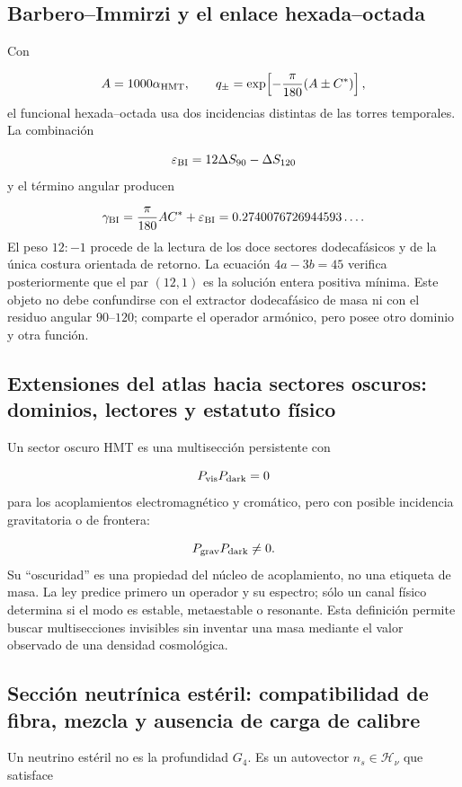 \subsection{Barbero–Immirzi y el enlace hexada–octada}
Con

\[
 A=1000\alpha_{\rm HMT},
\qquad
 q_\pm=\exp\!\left[-\frac{\pi}{180}(A\pm C^*)\right],
\]
el funcional hexada--octada usa dos incidencias distintas de las torres temporales. La combinación

\[
 \varepsilon_{\rm BI}
 =12\Delta S_{90}-\Delta S_{120}
\]
y el término angular producen

\[
 \gamma_{\rm BI}
 =\frac{\pi}{180}AC^*
 +\varepsilon_{\rm BI}
 =0.2740076726944593\ldots.
\]
El peso \(12:-1\) procede de la lectura de los doce sectores dodecafásicos
y de la única costura orientada de retorno. La ecuación
\(4a-3b=45\) verifica posteriormente que el par \((12,1)\) es la solución
entera positiva mínima. Este objeto no debe confundirse con el extractor dodecafásico de masa ni con el residuo angular \(90\)--\(120\); comparte el operador armónico, pero posee otro dominio y otra función.

\subsection{Extensiones del atlas hacia sectores oscuros: dominios, lectores y estatuto físico}
Un sector oscuro HMT es una multisección persistente con

\[
 P_{\rm vis}P_{\rm dark}=0
\]
para los acoplamientos electromagnético y cromático, pero con posible incidencia gravitatoria o de frontera:

\[
 P_{\rm grav}P_{\rm dark}\ne0.
\]
Su “oscuridad” es una propiedad del núcleo de acoplamiento, no una etiqueta de masa. La ley predice primero un operador y su espectro; sólo un canal físico determina si el modo es estable, metaestable o resonante. Esta definición permite buscar multisecciones invisibles sin inventar una masa mediante el valor observado de una densidad cosmológica.

\subsection{Sección neutrínica estéril: compatibilidad de fibra, mezcla y ausencia de carga de calibre}
Un neutrino estéril no es la profundidad \(G_4\). Es un autovector \(n_s\in\mathcal H_\nu\) que satisface

